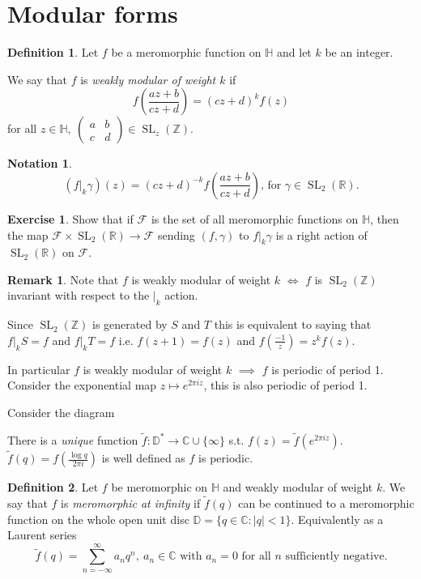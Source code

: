 \documentclass{article}
\theoremstyle{definition}
\newtheorem*{defn}{Definition}
\newtheorem*{exer}{Exercise}
\newtheorem*{rem}{Remark}
\newtheorem*{nota}{Notation}
\DeclareMathOperator{\SL}{SL}
\begin{document}
\section{Modular forms}
\begin{defn}
Let $f$ be a meromorphic function on $\mathbb{H}$ and let $k$ be an integer.

We say that $f$ is \emph{weakly modular of weight $k$} if
\[f\left(\frac{az+b}{cz+d}\right)= (cz+d)^kf(z)\] for all $z\in\mathbb{H},\ \begin{pmatrix}a&b\\c&d\end{pmatrix} \in\SL_z(\mathbb{Z})$.
\end{defn}

\begin{nota}
\[(f|_k\gamma)(z)=(cz+d)^{-k}f\left(\frac{az+b}{cz+d}\right)\text{, for }\gamma\in\SL_2(\mathbb{R}).\]
\end{nota}

\begin{exer}
Show that if $\mathcal{F}$ is the set of all meromorphic functions on $\mathbb{H}$, then the map $\mathcal{F}\times\SL_2(\mathbb{R})\to \mathcal{F}$ sending $(f,\gamma)$ to $f|_k\gamma$ is a right action of $\SL_2(\mathbb{R})$ on $\mathcal{F}$.
\end{exer}

\begin{rem}
Note that $f$ is weakly modular of weight $k$ $\iff$ $f$ is $\SL_2(\mathbb{Z})$ invariant with respect to the $|_k$ action.

Since $\SL_2(\mathbb{Z})$ is generated by $S$ and $T$ this is equivalent to saying that $f|_k S = f$ and $f|_k T = f$ i.e. $f(z+1) = f(z)$ and $f(\frac{-1}{z}) = z^kf(z)$.
\end{rem}

In particular $f$ is weakly modular of weight $k$ $\implies$ $f$ is periodic of period 1.
Consider the exponential map $z\mapsto e^{2\pi i z}$, this is also periodic of period 1.

Consider the diagram

There is a \emph{unique} function $\tilde f \colon \mathbb{D}^* \to \mathbb{C}\cup\{\infty\}$ s.t. $f(z) = \tilde f(e^{2\pi i z})$.
$\tilde f(q) = f(\frac{\log q}{2\pi i})$ is well defined as $f$ is periodic.

\begin{defn}
Let $f$ be meromorphic on $\mathbb{H}$ and weakly modular of weight $k$.
We say that $f$ is \emph{meromorphic at infinity} if $\tilde f(q)$ can be continued to a meromorphic function on the whole open unit disc $\mathbb{D} = \{q\in \mathbb{C}\colon |q|< 1\}$.
Equivalently as a Laurent series
\[\tilde f(q) = \sum_{n=-\infty}^{\infty} a_nq ^n,\ a_n\in\mathbb{C}\text{ with }a_n = 0\text{ for all $n$ sufficiently negative}.\]
\end{defn}
\end{document}
